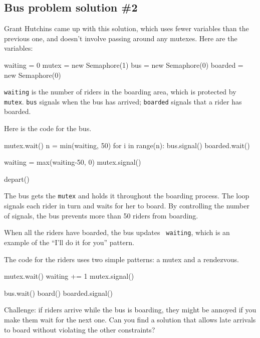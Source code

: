 \documentclass{book}
\begin{document}
\subsection {Bus problem solution \#2}

Grant Hutchins came up with this solution, which uses fewer
variables than the previous one, and doesn't involve passing
around any mutexes.  Here are the variables:

\begin{unbreakable}[title={Bus problem solution \#2 (initialization)}]{}
waiting = 0
mutex = new Semaphore(1)
bus = new Semaphore(0)
boarded = new Semaphore(0)
\end{unbreakable}

{\tt waiting} is the number of riders in the boarding area,
which is protected by {\tt mutex}.  {\tt bus} signals when the
bus has arrived; {\tt boarded} signals that a rider has boarded.

Here is the code for the bus.


\begin{unbreakable}[title={Bus problem solution (bus)}]{}
mutex.wait()
n = min(waiting, 50)
for i in range(n):
    bus.signal()
    boarded.wait()

waiting = max(waiting-50, 0)
mutex.signal()

depart()
\end{unbreakable}

The bus gets the {\tt mutex} and holds it throughout the boarding
process.  The loop signals each rider in turn and waits for her to
board.  By controlling the number of signals, the bus prevents
more than 50 riders from boarding.

When all the riders have boarded, the bus updates {\tt
        waiting}, which is an example of the ``I'll do it for you'' pattern.

The code for the riders uses two
simple patterns: a mutex and a rendezvous.


\begin{unbreakable}[title={Bus problem solution (riders)}]{}
mutex.wait()
     waiting += 1
mutex.signal()

bus.wait()
board()
boarded.signal()
\end{unbreakable}

Challenge: if riders arrive while the bus is boarding, they
might be annoyed if you make them wait for the next one.  Can you
find a solution that allows late arrivals to board without violating
the other constraints?
\end{document}
